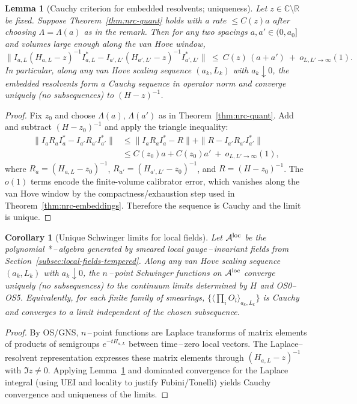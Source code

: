 \documentclass[11pt]{amsart}
\theoremstyle{plain}
\newtheorem{lemma}[theorem]{Lemma}
\newtheorem{corollary}[theorem]{Corollary}
\theoremstyle{definition}
\theoremstyle{remark}
\begin{document}
\begin{lemma}[Cauchy criterion for embedded resolvents; uniqueness]\label{lem:cauchy-resolvent-unique}
Let $z\in\mathbb C\setminus\mathbb R$ be fixed. Suppose Theorem~\ref{thm:nrc-quant} holds with a rate $\le C(z) a$ after choosing $\Lambda=\Lambda(a)$ as in the remark. Then for any two spacings $a,a'\in(0,a_0]$ and volumes large enough along the van Hove window,
\[
  \big\| I_{a,L}(H_{a,L}-z)^{-1} I_{a,L}^* - I_{a',L'}(H_{a',L'}-z)^{-1} I_{a',L'}^*\big\|\ \le\ C(z)\,(a+a')\ +\ o_{L,L'\to\infty}(1).
\]
In particular, along any van Hove scaling sequence $(a_k,L_k)$ with $a_k\downarrow 0$, the embedded resolvents form a Cauchy sequence in operator norm and converge uniquely (no subsequences) to $(H-z)^{-1}$.
\end{lemma}

\begin{proof}
Fix $z_0$ and choose $\Lambda(a)$, $\Lambda(a')$ as in Theorem~\ref{thm:nrc-quant}. Add and subtract $(H-z_0)^{-1}$ and apply the triangle inequality:
\[
\begin{aligned}
\| I_{a}R_a I_{a}^* - I_{a'}R_{a'} I_{a'}^* \|
&\le \| I_{a}R_a I_{a}^* - R \| + \| R - I_{a'}R_{a'} I_{a'}^* \|\\
&\le C(z_0) a + C(z_0) a'\ +\ o_{L,L'\to\infty}(1),
\end{aligned}
\]
where $R_a=(H_{a,L}-z_0)^{-1}$, $R_{a'}=(H_{a',L'}-z_0)^{-1}$, and $R=(H-z_0)^{-1}$. The $o(1)$ terms encode the finite-volume calibrator error, which vanishes along the van Hove window by the compactness/exhaustion step used in Theorem~\ref{thm:nrc-embeddings}. Therefore the sequence is Cauchy and the limit is unique.
\end{proof}
\begin{corollary}[Unique Schwinger limits for local fields]\label{cor:unique-schwinger-local}
Let $\mathcal A^{\rm loc}$ be the polynomial *\,–\,algebra generated by smeared local gauge\,–\,invariant fields from Section~\ref{subsec:local-fields-tempered}. Along any van Hove scaling sequence $(a_k,L_k)$ with $a_k\downarrow 0$, the $n$\,–\,point Schwinger functions on $\mathcal A^{\rm loc}$ converge uniquely (no subsequences) to the continuum limits determined by $H$ and OS0--OS5. Equivalently, for each finite family of smearings, $\{\langle \prod_i O_i\rangle_{a_k,L_k}\}$ is Cauchy and converges to a limit independent of the chosen subsequence.
\end{corollary}

\begin{proof}
By OS/GNS, $n$\,–\,point functions are Laplace transforms of matrix elements of products of semigroups $e^{-tH_{a,L}}$ between time\,–\,zero local vectors. The Laplace–resolvent representation expresses these matrix elements through $(H_{a,L}-z)^{-1}$ with $\Im z\ne 0$. Applying Lemma~\ref{lem:cauchy-resolvent-unique} and dominated convergence for the Laplace integral (using UEI and locality to justify Fubini/Tonelli) yields Cauchy convergence and uniqueness of the limits.
\end{proof}
\end{document}
